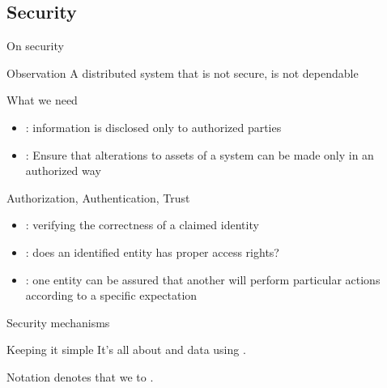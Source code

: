 \subsection{Security}
\begin{slide}{On security}
  \begin{alertblock}{Observation}
    A distributed system that is not secure, is not dependable
  \end{alertblock}
  \begin{block}{What we need}
    \begin{itemize}\firmlist
    \item {}: information is disclosed only to authorized parties
    \item {}: Ensure that alterations to assets of a system can be made only in an authorized way
    \end{itemize}
  \end{block}
  \begin{block}{Authorization, Authentication, Trust}
    \begin{itemize}\firmlist
    \item {}: verifying the correctness of a claimed identity
    \item {}: does an identified entity has proper access rights?
      \item {}: one entity can be assured that another will perform particular actions
        according to a specific expectation
    \end{itemize}
  \end{block}
\end{slide}
\begin{slide}{Security mechanisms}
  \begin{block}{Keeping it simple}
    It's all about  and  data using .
  \end{block}
  \begin{block}{Notation}
     denotes that we  to .
  \end{block}
\end{slide}
